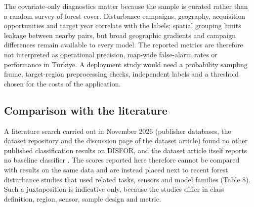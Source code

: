 \documentclass[10pt,a4paper,twocolumn]{article}
\begin{document}
The covariate-only diagnostics matter because the sample is curated rather than a random survey of forest cover. Disturbance campaigns, geography, acquisition opportunities and target year correlate with the labels; spatial grouping limits leakage between nearby pairs, but broad geographic gradients and campaign differences remain available to every model. The reported metrics are therefore not interpreted as operational precision, map-wide false-alarm rates or performance in Türkiye. A deployment study would need a probability sampling frame, target-region preprocessing checks, independent labels and a threshold chosen for the costs of the application.

\subsection{Comparison with the literature}
A literature search carried out in November 2026 (publisher databases, the dataset repository and the discussion page of the dataset article) found no other published classification results on DISFOR, and the dataset article itself reports no baseline classifier \cite{ref1}. The scores reported here therefore cannot be compared with results on the same data and are instead placed next to recent forest disturbance studies that used related tasks, sensors and model families (Table 8). Such a juxtaposition is indicative only, because the studies differ in class definition, region, sensor, sample design and metric.
\end{document}
